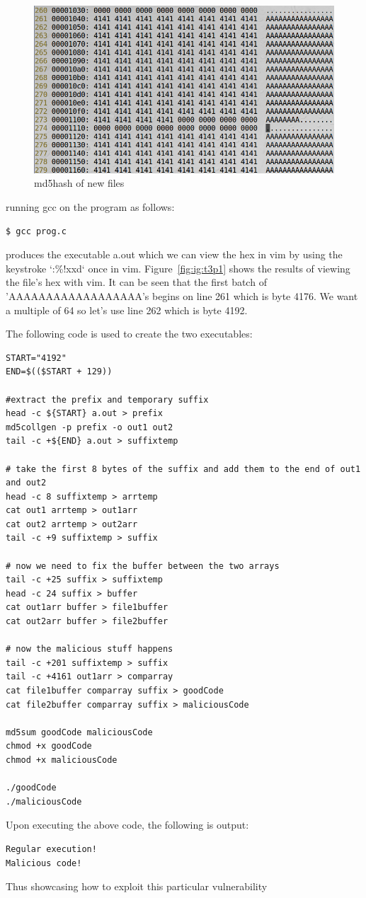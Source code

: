 \documentclass[12pt]{article}
\begin{document}
\begin{figure}[H]
	\begin{center}
		\includegraphics[scale=0.65]{pics/t4p0.png}
	\end{center}{}
	\caption{md5hash of new files}
	\label{fig:t3p1}
\end{figure}

running gcc on the program as follows:
\begin{verbatim}
$ gcc prog.c
\end{verbatim}

produces the executable a.out which we can view the hex in vim by using the keystroke `:\%!xxd` once in vim. Figure~\ref{fig:ig:t3p1} shows the results of viewing the file's hex with vim. It can be seen that the first batch of 'AAAAAAAAAAAAAAAAAA's begins on line 261 which is byte 4176. We want a multiple of 64 so let's use line 262 which is byte 4192.

The following code is used to create the two executables:

\begin{verbatim}
START="4192"
END=$(($START + 129))

#extract the prefix and temporary suffix
head -c ${START} a.out > prefix
md5collgen -p prefix -o out1 out2
tail -c +${END} a.out > suffixtemp

# take the first 8 bytes of the suffix and add them to the end of out1 and out2
head -c 8 suffixtemp > arrtemp
cat out1 arrtemp > out1arr
cat out2 arrtemp > out2arr
tail -c +9 suffixtemp > suffix

# now we need to fix the buffer between the two arrays
tail -c +25 suffix > suffixtemp
head -c 24 suffix > buffer
cat out1arr buffer > file1buffer
cat out2arr buffer > file2buffer

# now the malicious stuff happens 
tail -c +201 suffixtemp > suffix
tail -c +4161 out1arr > comparray
cat file1buffer comparray suffix > goodCode
cat file2buffer comparray suffix > maliciousCode

md5sum goodCode maliciousCode
chmod +x goodCode
chmod +x maliciousCode

./goodCode
./maliciousCode

\end{verbatim}

Upon executing the above code, the following is output:

\begin{verbatim}
Regular execution!
Malicious code!
\end{verbatim}

Thus showcasing how to exploit this particular vulnerability
\end{document}
